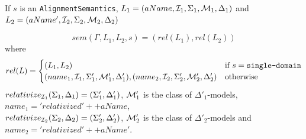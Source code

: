 \documentclass[10pt, a4paper]{isov2}
\newcommand*{\syntax}[1]{\texttt{#1}}
\begin{document}
If $s$ is an \syntax{AlignmentSemantics},
$L_1 = (aName, {\cal I}_1,\Sigma_1,{\cal M}_1,\Delta_1)$
and
$L_2 = (aName', {\cal I}_2,\Sigma_2,{\cal M}_2,\Delta_2)$

$$sem(\Gamma, L_1, L_2, s) = (rel(L_1), rel(L_2))$$
\noindent where $$ rel(L) = \begin{cases}
                                   (L_1,L_2) & \mbox{if } s = \syntax{single-domain}\\
                                   (name_1,\cI_1,\Sigma'_1,\cM'_1,\Delta'_1),
                                   (name_2,\cI_2,\Sigma'_2,\cM'_2,\Delta'_2)& \mbox{otherwise}
                                                                                                                  \end{cases}$$
                                                                                                                  \noindent
$relativize_{{\cal I}_1}(\Sigma_1,\Delta_1) = (\Sigma'_1,\Delta'_1)$,
${\cal M}'_1$ is the class of $\Delta'_1$-models,
$name_1 = 'relativized' ++ aName$,\\
$relativize_{{\cal I}_2}(\Sigma_2,\Delta_2) = (\Sigma'_2,\Delta'_2)$,
${\cal M}'_2$ is the class of $\Delta'_2$-models and
$name_2 = 'relativized'++aName'$.
                                                                                                                   
\end{document}
